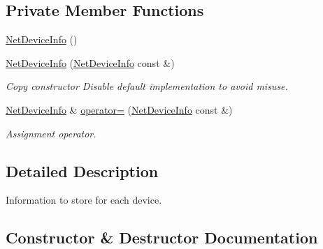 \subsection*{Private Member Functions}
\begin{DoxyCompactItemize}
\item 
\hyperlink{classns3_1_1TrafficControlLayer_1_1NetDeviceInfo_acf9e23e7aba2a85441925eeca95406a8}{Net\+Device\+Info} ()
\item 
\hyperlink{classns3_1_1TrafficControlLayer_1_1NetDeviceInfo_a6c5ee5c2ac28e6de0d879f5e7d71baa2}{Net\+Device\+Info} (\hyperlink{classns3_1_1TrafficControlLayer_1_1NetDeviceInfo}{Net\+Device\+Info} const \&)
\begin{DoxyCompactList}\small\item\em Copy constructor Disable default implementation to avoid misuse. \end{DoxyCompactList}\item 
\hyperlink{classns3_1_1TrafficControlLayer_1_1NetDeviceInfo}{Net\+Device\+Info} \& \hyperlink{classns3_1_1TrafficControlLayer_1_1NetDeviceInfo_aa762a38d15c36df8509d4696e4451d27}{operator=} (\hyperlink{classns3_1_1TrafficControlLayer_1_1NetDeviceInfo}{Net\+Device\+Info} const \&)
\begin{DoxyCompactList}\small\item\em Assignment operator. \end{DoxyCompactList}\end{DoxyCompactItemize}


\subsection{Detailed Description}
Information to store for each device. 

\subsection{Constructor \& Destructor Documentation}
